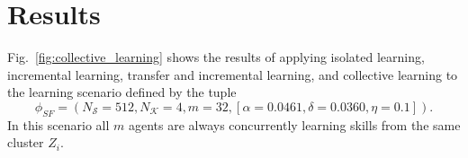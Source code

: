 \newpage
\section{Results}\label{sec:use_case_results}
Fig.~\ref{fig:collective_learning} shows the results of applying isolated learning, incremental learning, transfer and incremental learning, and collective learning to the learning scenario defined by the tuple
\begin{equation*}
	\phi_{SF} = \left(N_\mathcal{S}= 512, N_\mathcal{K}=4, m=32, \left[\alpha =  0.0461, \delta =  0.0360, \eta= 0.1\right]\right).
\end{equation*}
In this scenario all $m$ agents are always concurrently learning skills from the same cluster $Z_i$.
